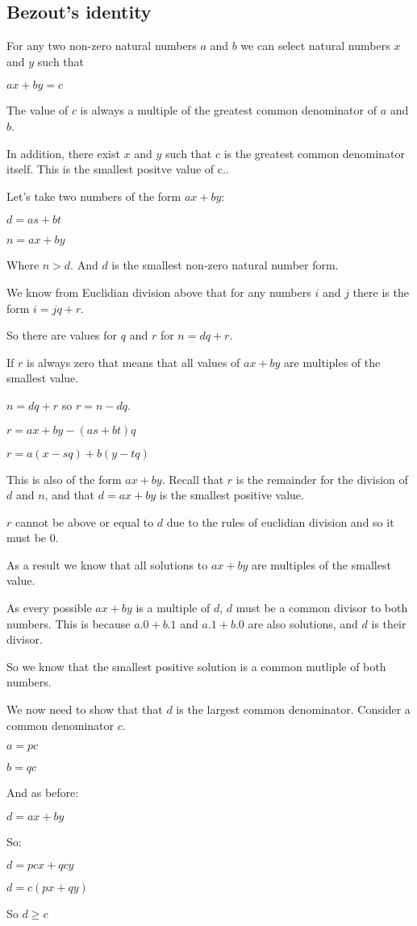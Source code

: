 
\subsection{Bezout's identity}

For any two non-zero natural numbers \(a\) and \(b\) we can select natural numbers \(x\) and \(y\) such that

\(ax+by=c\)

The value of \(c\) is always a multiple of the greatest common denominator of \(a\) and \(b\).

In addition, there exist \(x\) and \(y\) such that \(c\) is the greatest common denominator itself. This is the smallest positve value of c..


Let's take two numbers of the form \(ax+by\):

\(d=as+bt\)

\(n=ax+by\)

Where \(n>d\). And \(d\) is the smallest non-zero natural number form.

We know from Euclidian division above that for any numbers \(i\) and \(j\) there is the form \(i=jq+r\).

So there are values for \(q\) and \(r\) for \(n=dq+r\).

If \(r\) is always zero that means that all values of \(ax+by\) are multiples of the smallest value.

\(n=dq+r\) so \(r=n-dq\).

\(r=ax+by-(as+bt)q\)

\(r=a(x-sq)+b(y-tq)\)

This is also of the form \(ax+by\). Recall that \(r\) is the remainder for the division of \(d\) and \(n\), and that \(d=ax+by\) is the smallest positive value.

\(r\) cannot be above or equal to \(d\) due to the rules of euclidian division and so it must be \(0\).

As a result we know that all solutions to \(ax+by\) are multiples of the smallest value.

As every possible \(ax+by\) is a multiple of \(d\), \(d\) must be a common divisor to both numbers. This is because \(a.0+b.1\) and \(a.1+b.0\) are also solutions, and \(d\) is their divisor.

So we know that the smallest positive solution is a common mutliple of both numbers.

We now need to show that that \(d\) is the largest common denominator. Consider a common denominator \(c\).

\(a=pc\)

\(b=qc\)

And as before:

\(d=ax+by\)

So:

\(d=pcx+qcy\)

\(d=c(px+qy)\)

So \(d\ge c\)

